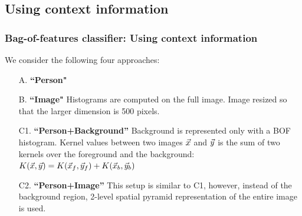 \documentclass{beamer}
\def\v#1{\protect\vec #1}
\begin{document}
\subsection{Using context information}
\begin{frame}
\frametitle{Bag-of-features classifier: Using context information}

We consider the following four approaches:
\begin{enumerate}
\item[A.] {\bf {}``Person"} 

\item[B.] {\bf {} ``Image"} 
 {Histograms are computed on the full image. Image resized so that the larger dimension is 500 pixels.}

\item[C1.] {\bf {} ``Person+Background''} 
 {Background is represented only with a BOF histogram. Kernel values between two images $\v x$ and $\v y$ 
is the sum of two kernels over the foreground and the background: $K(\v x,\v y)=K(\v x_f,\v y_f)+K(\v x_b,\v y_b)$}

\item[C2.] {\bf {} ``Person+Image''}
 {This setup is similar to C1, however, instead of the background
region, 2-level spatial pyramid representation of the entire image is used.}

\end{enumerate}




\end{frame}
\end{document}
